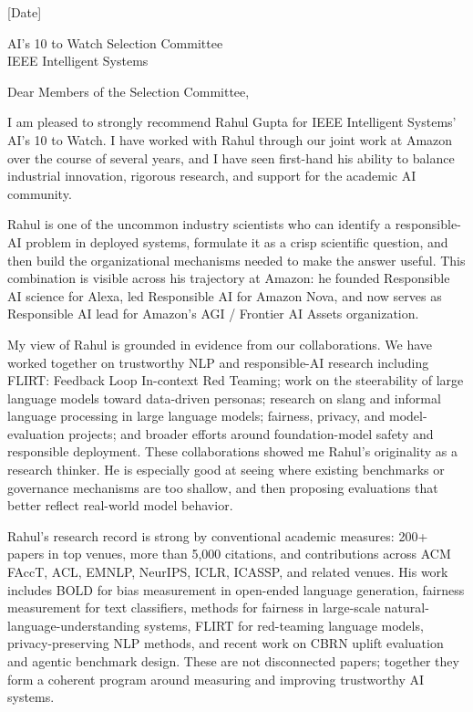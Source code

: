 \documentclass[11pt]{article}
\begin{document}
[Date]

AI's 10 to Watch Selection Committee\\
IEEE Intelligent Systems

Dear Members of the Selection Committee,

I am pleased to strongly recommend Rahul Gupta for IEEE Intelligent Systems' AI's 10 to Watch. I have worked with Rahul through our joint work at Amazon over the course of several years, and I have seen first-hand his ability to balance industrial innovation, rigorous research, and support for the academic AI community.

Rahul is one of the uncommon industry scientists who can identify a responsible-AI problem in deployed systems, formulate it as a crisp scientific question, and then build the organizational mechanisms needed to make the answer useful. This combination is visible across his trajectory at Amazon: he founded Responsible AI science for Alexa, led Responsible AI for Amazon Nova, and now serves as Responsible AI lead for Amazon's AGI / Frontier AI Assets organization.

My view of Rahul is grounded in evidence from our collaborations. We have worked together on trustworthy NLP and responsible-AI research including FLIRT: Feedback Loop In-context Red Teaming; work on the steerability of large language models toward data-driven personas; research on slang and informal language processing in large language models; fairness, privacy, and model-evaluation projects; and broader efforts around foundation-model safety and responsible deployment. These collaborations showed me Rahul's originality as a research thinker. He is especially good at seeing where existing benchmarks or governance mechanisms are too shallow, and then proposing evaluations that better reflect real-world model behavior.

Rahul's research record is strong by conventional academic measures: 200+ papers in top venues, more than 5,000 citations, and contributions across ACM FAccT, ACL, EMNLP, NeurIPS, ICLR, ICASSP, and related venues. His work includes BOLD for bias measurement in open-ended language generation, fairness measurement for text classifiers, methods for fairness in large-scale natural-language-understanding systems, FLIRT for red-teaming language models, privacy-preserving NLP methods, and recent work on CBRN uplift evaluation and agentic benchmark design. These are not disconnected papers; together they form a coherent program around measuring and improving trustworthy AI systems.
\end{document}
